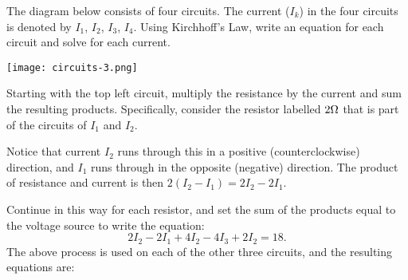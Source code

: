 \documentclass{ximera}
\begin{document}
\begin{example}

  The diagram below consists of four circuits. The current ($I_k$) in
  the four circuits is denoted by $I_1$, $I_2$, $I_3$, $I_4$. Using
  Kirchhoff's Law, write an equation for each circuit and solve for
  each current.

  \begin{center}
    \texttt{[image: circuits-3.png]}
  \end{center}

  Starting with the top left circuit, multiply the resistance by the
  current and sum the resulting products. Specifically, consider the
  resistor labelled $2 \ohm$ that is part of the circuits of $I_1$ and
  $I_2$. 
  
  Notice that current $I_2$ runs through this in a positive
  (counterclockwise) direction, and $I_1$ runs through in the opposite
  (negative) direction. The product of resistance and current is then
  $2 (I_2 - I_1) = 2I_2 - 2I_1$.  
  
  Continue in this way for each
  resistor, and set the sum of the products equal to the voltage
  source to write the equation:
  \begin{equation*}
    2I_2-2I_1+4I_2-4I_3+2I_2=18.
  \end{equation*}
  The above process is used on each of the other three circuits, and
  the resulting equations are:


\end{example}
\end{document}
